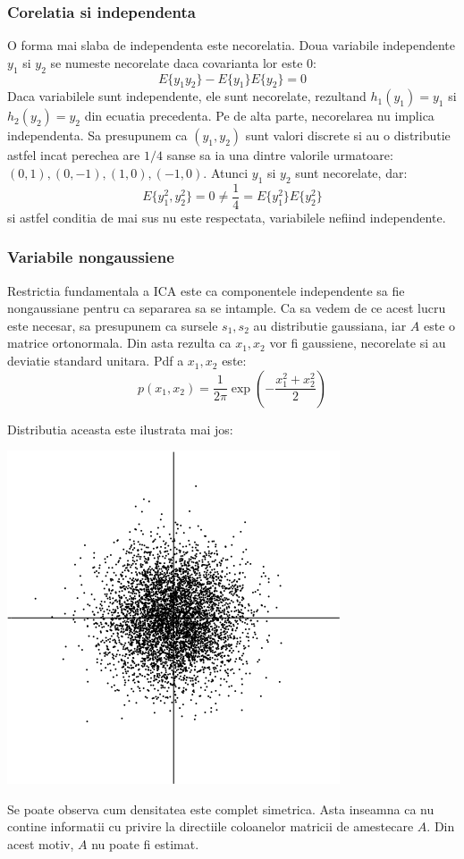 \documentclass[12pt,oneside]{article}
\begin{document}
\subsubsection{Corelatia si independenta}
O forma mai slaba de independenta este necorelatia. Doua variabile independente $y_1$ si $y_2$ se numeste necorelate daca covarianta lor este 0:
\begin{equation}
	E\{y_1y_2\}-E\{y_1\}E\{y_2\}=0
\end{equation}
Daca variabilele sunt independente, ele sunt necorelate, rezultand $h_1(y_1)=y_1$ si $h_2(y_2)=y_2$ din ecuatia precedenta.
Pe de alta parte, necorelarea nu implica independenta. Sa presupunem ca $(y_1,y_2)$ sunt valori discrete si au o distributie astfel incat perechea are $1/4$ sanse sa ia una dintre valorile urmatoare: $(0,1),(0,-1),(1,0),(-1,0)$. Atunci $y_1$ si $y_2$ sunt necorelate, dar:
\begin{equation}
E\{y_1^2, y_2^2\}=0 \neq \frac{1}{4} = E\{y_1^2\}E\{y_2^2\}
\end{equation}
si astfel conditia de mai sus nu este respectata, variabilele nefiind independente.
\subsubsection{Variabile nongaussiene}
Restrictia fundamentala a ICA este ca componentele independente sa fie nongaussiane pentru ca separarea sa se intample. Ca sa vedem de ce acest lucru este necesar, sa presupunem ca sursele $s_1, s_2$ au distributie gaussiana, iar $A$ este o matrice ortonormala. Din asta rezulta ca $x_1,x_2$ vor fi gaussiene, necorelate si au deviatie standard unitara. Pdf a $x_1, x_2$ este:
\begin{equation}
	p(x_1,x_2)=\frac{1}{2\pi}\exp(-\frac{x_1^2+x_2^2}{2})
\end{equation}

Distributia aceasta este ilustrata mai jos:
\begin{center}
	\includegraphics[scale=0.9]{multivariate_gaussian_distribution}
 \end{center}
 Se poate observa cum densitatea este complet simetrica. Asta inseamna ca nu contine informatii cu privire la directiile coloanelor matricii de amestecare $A$. Din acest motiv, $A$ nu poate fi estimat.
\end{document}
